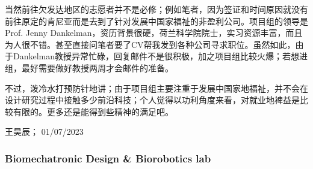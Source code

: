 当然前往欠发达地区的志愿者并不是必修；例如笔者，因为签证和时间原因就没有前往原定的肯尼亚而是去到了针对发展中国家福祉的非盈利公司。项目组的领导是Prof. Jenny Dankelman，资历背景很硬，荷兰科学院院士，实习资源丰富，而且为人很不错。甚至直接问笔者要了CV帮我发到各种公司寻求职位。虽然如此，由于Dankelman教授异常忙碌，回复邮件不是很积极，加之项目组比较火爆；若想进组，最好需要做好教授两周才会邮件的准备。

不过，泼冷水打预防针地讲；由于项目组主要注重于发展中国家地福祉，并不会在设计研究过程中接触多少前沿科技；个人觉得以功利角度来看，对就业地裨益是比较有限的。更多还是能得到些精神的满足吧。
\begin{flushright}
王昊辰； 01/07/2023
\end{flushright}
\subsubsection{Biomechatronic Design \& Biorobotics lab}




